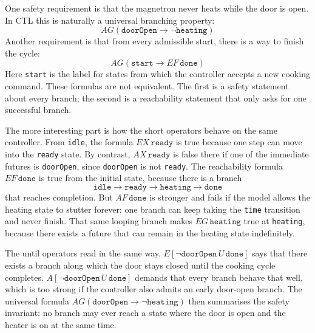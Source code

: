 One safety requirement is that the magnetron never heats while the door is
open.  In CTL this is naturally a universal branching property:
\[
  AG(\texttt{doorOpen} \rightarrow \neg \texttt{heating})
\]
Another requirement is that from every admissible start, there is a way to
finish the cycle:
\[
  AG(\texttt{start} \rightarrow EF\,\texttt{done})
\]
Here \texttt{start} is the label for states from which the controller accepts
a new cooking command.
These formulas are not equivalent.  The first is a safety statement about
every branch; the second is a reachability statement that only asks for one
successful branch.

The more interesting part is how the short operators behave on the same
controller.  From \texttt{idle}, the formula $EX\,\texttt{ready}$ is true
because one step can move into the \texttt{ready} state.  By contrast,
$AX\,\texttt{ready}$ is false there if one of the immediate futures is
\texttt{doorOpen}, since \texttt{doorOpen} is not \texttt{ready}.  The
reachability formula $EF\,\texttt{done}$ is true from the initial state,
because there is a branch
\[
  \texttt{idle} \rightarrow \texttt{ready} \rightarrow \texttt{heating}
  \rightarrow \texttt{done}
\]
that reaches completion.  But $AF\,\texttt{done}$ is stronger and fails if the
model allows the heating state to stutter forever: one branch can keep taking
the \texttt{time} transition and never finish.  That same looping branch makes
$EG\,\texttt{heating}$ true at \texttt{heating}, because there exists a future
that can remain in the heating state indefinitely.

The until operators read in the same way.  $E[\neg\texttt{doorOpen}\,U\,
\texttt{done}]$ says that there exists a branch along which the door stays
closed until the cooking cycle completes.  $A[\neg\texttt{doorOpen}\,U\,
\texttt{done}]$ demands that every branch behave that well, which is too
strong if the controller also admits an early door-open branch.  The universal
formula $AG(\texttt{doorOpen} \rightarrow \neg\texttt{heating})$ then
summarises the safety invariant: no branch may ever reach a state where the
door is open and the heater is on at the same time.

